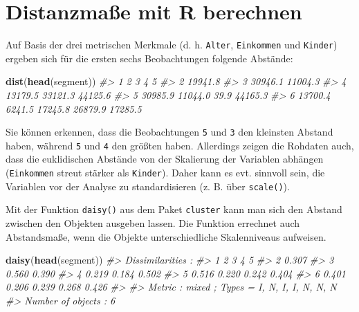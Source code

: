 \documentclass[12pt,ngerman,]{book}
\makeatletter
\newenvironment{Shaded}{\begin{snugshade}}{\end{snugshade}}
\newcommand{\KeywordTok}[1]{\textcolor[rgb]{0.13,0.29,0.53}{\textbf{{#1}}}}
\newcommand{\CommentTok}[1]{\textcolor[rgb]{0.56,0.35,0.01}{\textit{{#1}}}}
\newcommand{\NormalTok}[1]{{#1}}
\newenvironment{kframe}{%
\medskip{}
\setlength{\fboxsep}{.8em}
 \def\at@end@of@kframe{}%
 \ifinner\ifhmode%
  \def\at@end@of@kframe{\end{minipage}}%
  \begin{minipage}{\columnwidth}%
 \fi\fi%
 \def\FrameCommand##1{\hskip\@totalleftmargin \hskip-\fboxsep
 \colorbox{shadecolor}{##1}\hskip-\fboxsep
     \hskip-\linewidth \hskip-\@totalleftmargin \hskip\columnwidth}%
 \MakeFramed {\advance\hsize-\width
   \@totalleftmargin\z@ \linewidth\hsize
   \@setminipage}}%
 {\par\unskip\endMakeFramed%
 \at@end@of@kframe}
\renewenvironment{Shaded}{\begin{kframe}}{\end{kframe}}
\makeatother
\begin{document}
\section{Distanzmaße mit R berechnen}\label{distanzmae-mit-r-berechnen}

Auf Basis der drei metrischen Merkmale (d. h. \texttt{Alter},
\texttt{Einkommen} und \texttt{Kinder}) ergeben sich für die ersten
sechs Beobachtungen folgende Abstände:

\begin{Shaded}
\begin{Highlighting}[]
\KeywordTok{dist}\NormalTok{(}\KeywordTok{head}\NormalTok{(segment))}
\CommentTok{#>         1       2       3       4       5}
\CommentTok{#> 2 19941.8                                }
\CommentTok{#> 3 30946.1 11004.3                        }
\CommentTok{#> 4 13179.5 33121.3 44125.6                }
\CommentTok{#> 5 30985.9 11044.0    39.9 44165.3        }
\CommentTok{#> 6 13700.4  6241.5 17245.8 26879.9 17285.5}
\end{Highlighting}
\end{Shaded}

Sie können erkennen, dass die Beobachtungen \texttt{5} und \texttt{3}
den kleinsten Abstand haben, während \texttt{5} und \texttt{4} den
größten haben. Allerdings zeigen die Rohdaten auch, dass die
euklidischen Abstände von der Skalierung der Variablen abhängen
(\texttt{Einkommen} streut stärker als \texttt{Kinder}). Daher kann es
evt. sinnvoll sein, die Variablen vor der Analyse zu standardisieren (z.
B. über \texttt{scale()}).

Mit der Funktion \texttt{daisy()} aus dem Paket \texttt{cluster} kann
man sich den Abstand zwischen den Objekten ausgeben lassen. Die Funktion
errechnet auch Abstandsmaße, wenn die Objekte unterschiedliche
Skalenniveaus aufweisen.

\begin{Shaded}
\begin{Highlighting}[]
\KeywordTok{daisy}\NormalTok{(}\KeywordTok{head}\NormalTok{(segment))}
\CommentTok{#> Dissimilarities :}
\CommentTok{#>       1     2     3     4     5}
\CommentTok{#> 2 0.307                        }
\CommentTok{#> 3 0.560 0.390                  }
\CommentTok{#> 4 0.219 0.184 0.502            }
\CommentTok{#> 5 0.516 0.220 0.242 0.404      }
\CommentTok{#> 6 0.401 0.206 0.239 0.268 0.426}
\CommentTok{#> }
\CommentTok{#> Metric :  mixed ;  Types = I, N, I, I, N, N, N }
\CommentTok{#> Number of objects : 6}
\end{Highlighting}
\end{Shaded}
\end{document}
